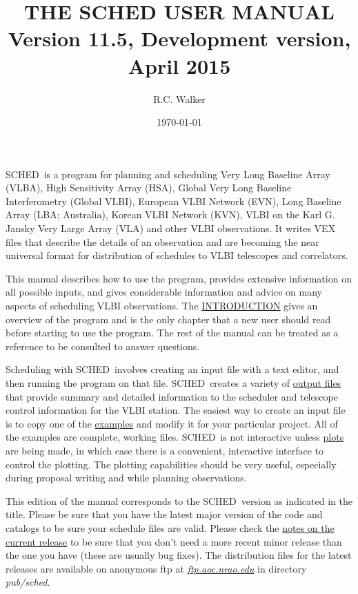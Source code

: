 \documentclass{report}
\newcommand{\schedb}{{\sc SCHED~}}
\begin{document}
\title{THE SCHED USER MANUAL \protect\\ Version 11.5,  Development version, April 2015}
\author{R.C. Walker}
\date{\today}
\maketitle


\schedb is a program for planning and scheduling Very Long Baseline
Array (VLBA), High Sensitivity Array (HSA), Global Very Long Baseline
Interferometry (Global VLBI), European VLBI Network (EVN), Long
Baseline Array (LBA; Australia), Korean VLBI Network (KVN), VLBI on
the Karl G. Jansky Very Large Array (VLA) and other VLBI observations.
It writes VEX files that describe the details of an observation and
are becoming the near universal format for distribution of schedules
to VLBI telescopes and correlators.

This manual describes how to use the program, provides extensive
information on all possible inputs, and gives considerable information
and advice on many aspects of scheduling VLBI observations.  The
{\hyperref[CHP:INTRO]{INTRODUCTION}} gives an overview of the program and
is the only chapter that a new user should read before starting to use
the program.  The rest of the manual can be treated as a reference to
be consulted to answer questions.

Scheduling with \schedb involves creating an input file with a text
editor, and then running the program on that file.  \schedb creates a
variety of 
{\hyperref[SEC:FILES]{output files}} that provide summary and
detailed information to the scheduler and telescope control
information for the VLBI station.  The easiest way to create an input
file is to copy one of the 
{\hyperref[SEC:EXAMPLES]{examples}} and
modify it for your particular project.  All of the examples are
complete, working files.  \schedb is not interactive unless
{\hyperref[SEC:PLOT]{plots}} are being made, in which case there is a
convenient, interactive interface to control the plotting.  The
plotting capabilities should be very useful, especially during
proposal writing and while planning observations.

This edition of the manual corresponds to the \schedb version as
indicated in the title.  Please be sure that you have the latest major
version of the code and catalogs to be sure your schedule files are
valid.  Please check the 
{\hyperref[SEC:CURRENT]{notes on the current release}}
to be sure that you don't need a more recent
minor release than the one you have (these are usually bug fixes).
The distribution files for the latest releases are available on
anonymous ftp at 
{\href{ftp://ftp.aoc.nrao.edu/pub/sched}{{\sl ftp.aoc.nrao.edu}}} in directory {\sl pub/sched}.
\end{document}
